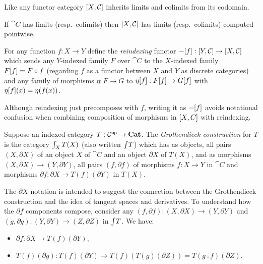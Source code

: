 Like any functor category $[X,\mathcal{C}]$ inherits limits and colimits from its codomain.

\begin{proposition}
If $\cat{C}$ has limits (resp.~colimits) then $[X,\mathcal{C}]$ has limits (resp.~colimits) computed
pointwise.
\end{proposition}

\begin{definition}[Reindexing]
For any function $f: X \to Y$ define the \emph{reindexing} functor $-[f]: [Y,\mathcal{C}] \to
[X,\mathcal{C}]$ which sends any $Y$-indexed family $F$ over $\cat{C}$ to the $X$-indexed family
$F[f] = F \circ f$ (regarding $f$ as a functor between $X$ and $Y$ as discrete categories) and any
family of morphisms $\eta: F \to G$ to $\eta[f]: F[f] \to G[f]$ with
$\eta[f](x) = \eta(f(x))$.
\end{definition}

Although reindexing just precomposes with $f$, writing it as $-[f]$ avoids notational confusion when
combining composition of morphisms in $[X,C]$ with reindexing.

\begin{definition}
\label{def:grothendieck:Grothendieck}
Suppose an indexed category $T: \mathcal{C}^{\mathsf{op}} \to \mathbf{Cat}$. The \emph{Grothendieck construction} for $T$ is the
category $\int_{X}T(X)$ (also written $\int_{}T$) which has as objects, all pairs $(X,
\partial X)$ of an object $X$ of $\cat{C}$ and an object $\partial X$ of $T(X)$, and as morphisms $(X,
\partial X) \to (Y, \partial Y)$, all pairs $(f, \partial f)$ of morphisms $f: X \to Y$ in $\cat{C}$ and
morphisms $\partial f: \partial X \to T(f)(\partial Y)$ in $T(X)$.
\end{definition}

\noindent The $\partial X$ notation is intended to suggest the connection between the Grothendieck
construction and the idea of tangent spaces and derivatives. To understand how the $\partial f$ components
compose, consider any $(f, \partial f): (X, \partial X) \to (Y, \partial Y)$ and $(g, \partial g): (Y,
\partial Y) \to (Z, \partial Z)$ in $\int_{}T$. We have:

\begin{itemize}
\item $\partial f: \partial X \to T(f)(\partial Y)$;
\item $T(f)(\partial g): T(f)(\partial Y) \to T(f)(T(g)(\partial Z)) = T(g \comp f)(\partial Z)$.
\end{itemize}


